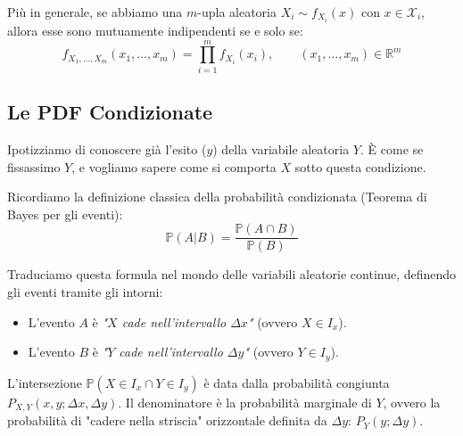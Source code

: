 Più in generale, se abbiamo una $m$-upla aleatoria $X_i \sim f_{X_i}(x)$ con $x \in \mathcal{X}_i$, allora esse sono mutuamente indipendenti se e solo se:
\begin{equation}
f_{X_1, \dots, X_m}(x_1, \dots, x_m) = \prod_{i=1}^{m} f_{X_i}(x_i), \qquad (x_1, \dots, x_m) \in \mathbb{R}^m
\end{equation}
\subsection{Le PDF Condizionate}

Ipotizziamo di conoscere già l'esito ($y$) della variabile aleatoria $Y$. È come se fissassimo $Y$, e vogliamo sapere come si comporta $X$ sotto questa condizione.

Ricordiamo la definizione classica della probabilità condizionata (Teorema di Bayes per gli eventi):
\begin{equation}
\mathbb{P}(A|B) = \frac{\mathbb{P}(A \cap B)}{\mathbb{P}(B)}
\end{equation}

Traduciamo questa formula nel mondo delle variabili aleatorie continue, definendo gli eventi tramite gli intorni:
\begin{itemize}
    \item L'evento $A$ è \textit{"$X$ cade nell'intervallo $\Delta x$"} (ovvero $X \in I_x$).
    \item L'evento $B$ è \textit{"$Y$ cade nell'intervallo $\Delta y$"} (ovvero $Y \in I_y$).
\end{itemize}

L'intersezione $\mathbb{P}(X \in I_x \cap Y \in I_y)$ è data dalla probabilità congiunta $P_{X,Y}(x,y; \Delta x, \Delta y)$.
Il denominatore è la probabilità marginale di $Y$, ovvero la probabilità di "cadere nella striscia" orizzontale definita da $\Delta y$: $P_Y(y; \Delta y)$.

